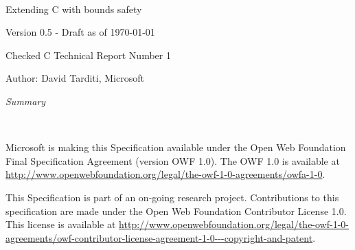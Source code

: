 \documentclass[11pt]{report}
\begin{document}
\begin{titlepage}
{\center
\mbox{ }\\
\vspace{2in}
{\huge Extending C with bounds safety \par}
{Version 0.5 - Draft as of \today \par}
\vspace{0.5in}
{Checked C Technical Report Number 1 \par}
\vspace{0.25in}
{Author: David Tarditi, Microsoft\par} 
\vspace{1in}
{\it Summary \par}

}
\end{titlepage}

\thispagestyle{empty}
\mbox{  }\\
\vspace{1.0in}

Microsoft is making this Specification available under the Open Web
Foundation Final Specification Agreement (version OWF 1.0).  The OWF 1.0
is available at {\color{blue} \url{http://www.openwebfoundation.org/legal/the-owf-1-0-agreements/owfa-1-0}}.

This Specification is part of an on-going research project.
Contributions to this specification
are made under the Open Web Foundation Contributor License 1.0. 
This license is available at {\color{blue} \url{http://www.openwebfoundation.org/legal/the-owf-1-0-agreements/owf-contributor-license-agreement-1-0---copyright-and-patent}}.

\newpage

\setcounter{page}{1}

\tableofcontents

\setcounter{page}{1}














\nocite{Jones2009}
\nocite{Jim2002}



\appendix
% 
% 
\end{document}
